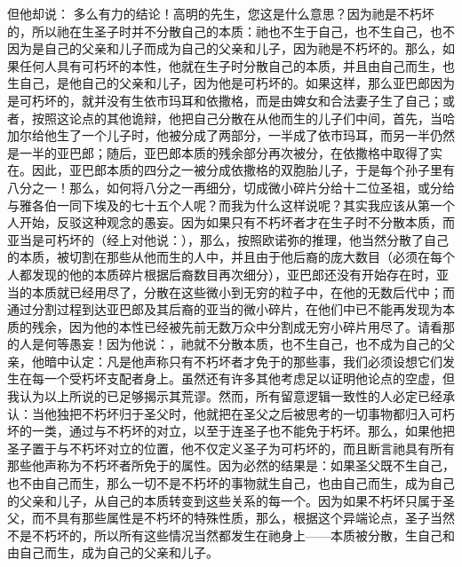 但他却说： 多么有力的结论！高明的先生，您这是什么意思？因为祂是不朽坏的，所以祂在生圣子时并不分散自己的本质：祂也不生于自己，也不生自己，也不因为是自己的父亲和儿子而成为自己的父亲和儿子，因为祂是不朽坏的。那么，如果任何人具有可朽坏的本性，他就在生子时分散自己的本质，并且由自己而生，也生自己，是他自己的父亲和儿子，因为他是可朽坏的。如果这样，那么亚巴郎因为是可朽坏的，就并没有生依市玛耳和依撒格，而是由婢女和合法妻子生了自己；或者，按照这论点的其他诡辩，他把自己分散在从他而生的儿子们中间，首先，当哈加尔给他生了一个儿子时，他被分成了两部分，一半成了依市玛耳，而另一半仍然是一半的亚巴郎；随后，亚巴郎本质的残余部分再次被分，在依撒格中取得了实在。因此，亚巴郎本质的四分之一被分成依撒格的双胞胎儿子，于是每个孙子里有八分之一！那么，如何将八分之一再细分，切成微小碎片分给十二位圣祖，或分给与雅各伯一同下埃及的七十五个人呢？而我为什么这样说呢？其实我应该从第一个人开始，反驳这种观念的愚妄。因为如果只有不朽坏者才在生子时不分散本质，而亚当是可朽坏的（经上对他说：），那么，按照欧诺弥的推理，他当然分散了自己的本质，被切割在那些从他而生的人中，并且由于他后裔的庞大数目（必须在每个人都发现的他的本质碎片根据后裔数目再次细分），亚巴郎还没有开始存在时，亚当的本质就已经用尽了，分散在这些微小到无穷的粒子中，在他的无数后代中；而通过分割过程到达亚巴郎及其后裔的亚当的微小碎片，在他们中已不能再发现为本质的残余，因为他的本性已经被先前无数万众中分割成无穷小碎片用尽了。请看那的人是何等愚妄！因为他说：，祂就不分散本质，也不生自己，也不成为自己的父亲，他暗中认定：凡是他声称只有不朽坏者才免于的那些事，我们必须设想它们发生在每一个受朽坏支配者身上。虽然还有许多其他考虑足以证明他论点的空虚，但我认为以上所说的已足够揭示其荒谬。然而，所有留意逻辑一致性的人必定已经承认：当他独把不朽坏归于圣父时，他就把在圣父之后被思考的一切事物都归入可朽坏的一类，通过与不朽坏的对立，以至于连圣子也不能免于朽坏。那么，如果他把圣子置于与不朽坏对立的位置，他不仅定义圣子为可朽坏的，而且断言祂具有所有那些他声称为不朽坏者所免于的属性。因为必然的结果是：如果圣父既不生自己，也不由自己而生，那么一切不是不朽坏的事物就生自己，也由自己而生，成为自己的父亲和儿子，从自己的本质转变到这些关系的每一个。因为如果不朽坏只属于圣父，而不具有那些属性是不朽坏的特殊性质，那么，根据这个异端论点，圣子当然不是不朽坏的，所以所有这些情况当然都发生在祂身上——本质被分散，生自己和由自己而生，成为自己的父亲和儿子。\par

